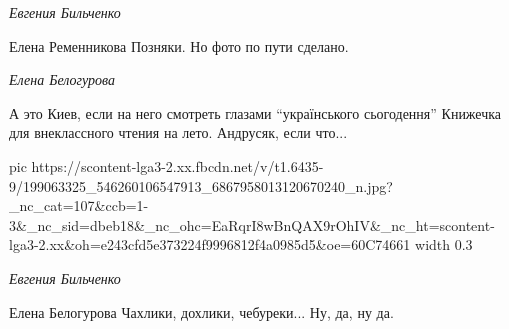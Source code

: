 \emph{Евгения Бильченко}

Елена Ременникова Позняки. Но фото по пути сделано.

\emph{Елена Белогурова}

А это Киев, если на него смотреть глазами \enquote{українського сьогодення} Книжечка
для внеклассного чтения на лето. Андрусяк, если что...

\ifcmt
  pic https://scontent-lga3-2.xx.fbcdn.net/v/t1.6435-9/199063325_546260106547913_6867958013120670240_n.jpg?_nc_cat=107&ccb=1-3&_nc_sid=dbeb18&_nc_ohc=EaRqrI8wBnQAX9rOhIV&_nc_ht=scontent-lga3-2.xx&oh=e243cfd5e373224f9996812f4a0985d5&oe=60C74661
	width 0.3
\fi

\emph{Евгения Бильченко}

Елена Белогурова Чахлики, дохлики, чебуреки... Ну, да, ну да.
